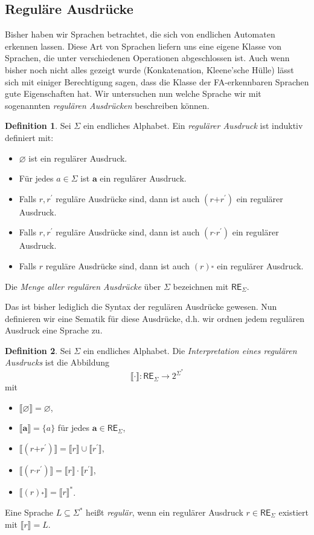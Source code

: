 \documentclass[11pt, a4paper]{article}
\theoremstyle{definition}
\newtheorem{definition}{Definition}[section]
\theoremstyle{plain}
\numberwithin{equation}{section}
\let\emptyset\varnothing
\begin{document}
\subsection{Reguläre Ausdrücke}\label{sec:regular_regexp}
Bisher haben wir Sprachen betrachtet, die sich von endlichen Automaten erkennen lassen. Diese Art von Sprachen liefern uns eine eigene Klasse von Sprachen, die unter verschiedenen Operationen abgeschlossen ist. Auch wenn bisher noch nicht alles gezeigt wurde (Konkatenation, Kleene'sche Hülle) lässt sich mit einiger Berechtigung sagen, dass die Klasse der FA-erkennbaren Sprachen gute Eigenschaften hat. Wir untersuchen nun welche Sprache wir mit sogenannten \textit{regulären Ausdrücken} beschreiben können.
\begin{definition}\label{def:regexsyntax}
	Sei \( \Sigma \) ein endliches Alphabet. Ein \textit{regulärer Ausdruck} ist induktiv definiert mit:
	\begin{itemize}
		\item \( \bm{\emptyset} \) ist ein regulärer Ausdruck.
		\item Für jedes \( a \in \Sigma \) ist \( \bm{a} \) ein regulärer Ausdruck.
		\item Falls \( r, r^\prime \) reguläre Ausdrücke sind, dann ist auch \( (r \bm{+} r^\prime) \) ein regulärer Ausdruck.
		\item Falls \( r, r^\prime \) reguläre Ausdrücke sind, dann ist auch \( (r \bm{\cdot} r^\prime) \) ein regulärer Ausdruck.
		\item Falls \( r \) reguläre Ausdrücke sind, dann ist auch \( (r) \overset{\bm{\ast}}{} \) ein regulärer Ausdruck.
	\end{itemize}
	Die \textit{Menge aller regulären Ausdrücke} über \( \Sigma \) bezeichnen mit \( \mathsf{RE}_\Sigma \).
\end{definition}
Das ist bisher lediglich die Syntax der regulären Ausdrücke gewesen. Nun definieren wir eine Sematik für diese Ausdrücke, d.h. wir ordnen jedem regulären Ausdruck eine Sprache zu.
\begin{definition}
	Sei \( \Sigma \) ein endliches Alphabet. Die \textit{Interpretation eines regulären Ausdrucks} ist die Abbildung
	\[
		\llbracket \cdot \rrbracket \colon \mathsf{RE}_\Sigma \to 2^{\Sigma^\ast}
	\]
	mit
	\begin{itemize}
		\item \( \llbracket \bm{\emptyset} \rrbracket = \emptyset \),
		\item \( \llbracket \bm{a} \rrbracket = \{ a \} \) für jedes \( \bm{a} \in \mathsf{RE}_\Sigma \),
		\item \( \llbracket (r \bm{+} r^\prime) \rrbracket = \llbracket r \rrbracket \cup \llbracket r^\prime \rrbracket \),
		\item \( \llbracket (r \bm{\cdot} r^\prime) \rrbracket = \llbracket r \rrbracket \cdot \llbracket r^\prime \rrbracket \),
		\item \( \llbracket (r) \overset{\bm{\ast}}{} \rrbracket = \llbracket r \rrbracket^\ast \).
	\end{itemize}
	Eine Sprache \( L \subseteq \Sigma^\ast \) heißt \textit{regulär}, wenn ein regulärer Ausdruck \( r \in \mathsf{RE}_\Sigma \) existiert mit \( \llbracket r \rrbracket = L \).
\end{definition}
\end{document}
